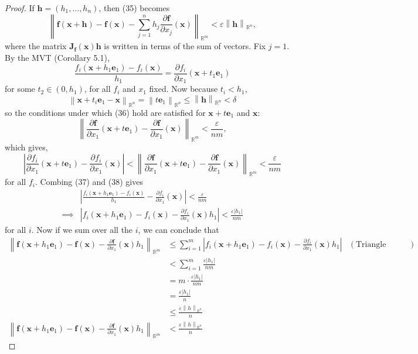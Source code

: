 \documentclass{article}
\newcommand{\R}{\mathbb{R}}
\newcommand{\x}{\mathbf{x}}
\newcommand{\f}{\mathbf{f}}
\newcommand{\h}{\mathbf{h}}
\newcommand{\norm}[1]{\left\lVert#1\right\rVert}
\theoremstyle{definition}
\begin{document}
\begin{proof}
		If $ \h = (h_1,\ldots, h_n) $, then (35) becomes 
		$$ \norm{\f(\x+\h) - \f(\x)-\sum_{j=1}^nh_j\frac{\partial \f}{\partial x_j}(\x)}_{\R^m} < \varepsilon\norm{\mathbf h}_{\R^n},$$ where the matrix $ \mathbf{J}_\f(\x) \mathbf{h} $ is written in terms of the sum of vectors. Fix $ j=1 $. By the MVT (Corollary 5.1), \begin{equation}\label{key}
			\frac{f_i(\x + h_1\mathbf e_1) - f_i(\x)}{h_1} = \frac{\partial f_i}{\partial x_1}(\x + t_1\mathbf e_1)
		\end{equation}for some $ t_2 \in (0,h_1) $, for all $ f_i $ and $ x_1 $ fixed. Now because $ t_i < h_1 $,
		$$\norm{\x + t_i\mathbf e_1 -  \x}_{\R^n} = \norm{t\mathbf e_1}_{\R^n} \le \norm{\mathbf h}_{\R^n} <\delta  $$
		so the conditions under which (36) hold are satisfied for $ \x + t\mathbf e_1 $ and $  \x $:
		\begin{equation*}\label{key}
			\norm{ \frac{\partial \f}{\partial x_1}(\x + t\mathbf e_1 ) - \frac{\partial \f}{\partial x_1}(\x) }_{\R^m} < \frac{\varepsilon}{nm},
		\end{equation*}
		which gives,
		\begin{equation}\label{key}
			\left\lvert \frac{\partial f_i}{\partial x_1}(\x + t\mathbf e_1 ) - \frac{\partial f_i}{\partial x_1}(\x) \right\rvert<\norm{ \frac{\partial \f}{\partial x_1}(\x + t\mathbf e_1 ) - \frac{\partial \f}{\partial x_1}(\x) }_{\R^m} < \frac{\varepsilon}{nm}
		\end{equation}
		for all $ f_i $. Combing (37) and (38) gives
		\begin{align*}
			&	\left\lvert \frac{f_i(\x + h_1\mathbf e_1) - f_i(\x)}{h_1}  - \frac{\partial f_i}{\partial x_1}(\x) \right\rvert < \frac{\varepsilon}{nm}\\
			\implies&  \left\lvert f_i(\x + h_1\mathbf e_1) - f_i(\x) - \frac{\partial f_i}{\partial x_1}(\x)h_1 \right\rvert < \frac{\varepsilon|h_1|}{nm}
		\end{align*}
		for all $ i $. Now if we sum over all the $ i $, we can conclude that 
		\begin{align}
			\norm{\f(\x + h_1\mathbf e_1) - \f(\x) - \frac{\partial \f}{\partial x_1}(\x)h_1}_{\R^m} & \le \sum_{i=1}^m  \left\lvert f_i(\x + h_1\mathbf e_1) - f_i(\x) - \frac{\partial f_i}{\partial x_1}(\x)h_1 \right\rvert  & (\text{Triangle Inequality, Definition 8.2})\nonumber\\ & < \sum_{i=1}^m \frac{\varepsilon|h_1|}{nm}\nonumber\\ & = m \cdot \frac{\varepsilon|h_1|}{nm}\nonumber \\ & = \frac{\varepsilon|h_1|}{n}\nonumber\\ & \le \frac{\varepsilon\norm{h}_{\R^n}}{n}\nonumber\\
			\norm{\f(\x + h_1\mathbf e_1) - \f(\x) - \frac{\partial \f}{\partial x_1}(\x)h_1}_{\R^m} &< \frac{\varepsilon\norm{h}_{\R^n}}{n} 
		\end{align}
		

\end{proof}
\end{document}
